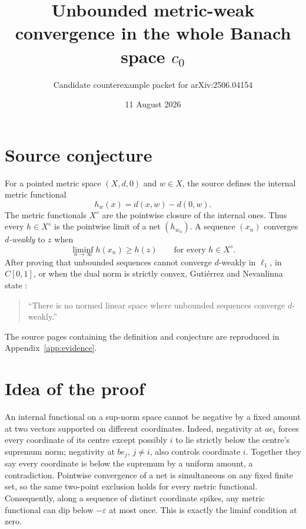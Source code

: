 \documentclass[11pt]{article}
\title{Unbounded metric-weak convergence in the whole Banach space $c_0$}
\author{Candidate counterexample packet for arXiv:2506.04154}
\date{11 August 2026}
\begin{document}
\maketitle

\begin{center}
\end{center}

\section{Source conjecture}

For a pointed metric space $(X,d,0)$ and $w\in X$, the source defines the
internal metric functional
\[
 h_w(x)=d(x,w)-d(0,w).
\]
The metric functionals $X^\diamond$ are the pointwise closure of the internal
ones.  Thus every $h\in X^\diamond$ is the pointwise limit of a net
$(h_{w_\alpha})$.  A sequence $(x_n)$ converges \emph{$d$-weakly} to $z$ when
\begin{equation}\label{eq:dweak}
 \liminf_{n\to\infty} h(x_n)\ge h(z)
 \qquad\text{for every }h\in X^\diamond.
\end{equation}
After proving that unbounded sequences cannot converge $d$-weakly in
$\ell_1$, in $C[0,1]$, or when the dual norm is strictly convex, Guti\'errez
and Nevanlinna state \cite[Conjecture~1.5]{source}:
\begin{quote}
``There is no normed linear space where unbounded sequences converge
$d$-weakly.''
\end{quote}
The source pages containing the definition and conjecture are reproduced in
Appendix~\ref{app:evidence}.

\section*{Idea of the proof}

An internal functional on a sup-norm space cannot be negative by a fixed
amount at two vectors supported on different coordinates.  Indeed, negativity
at $a e_i$ forces every coordinate of its centre except possibly $i$ to lie
strictly below the centre's supremum norm; negativity at $b e_j$, $j\ne i$,
also controls coordinate $i$.  Together they say every coordinate is below
the supremum by a uniform amount, a contradiction.  Pointwise convergence of
a net is simultaneous on any fixed finite set, so the same two-point exclusion
holds for every metric functional.  Consequently, along a sequence of
distinct coordinate spikes, any metric functional can dip below
$-\varepsilon$ at most once.  This is exactly the liminf condition at zero.
\end{document}
